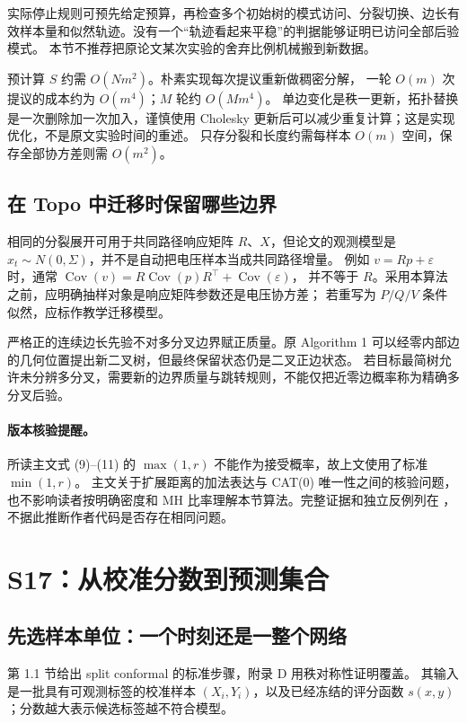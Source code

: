 实际停止规则可预先给定预算，再检查多个初始树的模式访问、分裂切换、边长有效样本量和似然轨迹。没有一个“轨迹看起来平稳”的判据能够证明已访问全部后验模式。
本节不推荐把原论文某次实验的舍弃比例机械搬到新数据。

预计算 $S$ 约需 $O(Nm^2)$。朴素实现每次提议重新做稠密分解，
一轮 $O(m)$ 次提议的成本约为 $O(m^4)$；$M$ 轮约 $O(Mm^4)$。
单边变化是秩一更新，拓扑替换是一次删除加一次加入，谨慎使用 Cholesky 更新后可以减少重复计算；这是实现优化，不是原文实验时间的重述。
只存分裂和长度约需每样本 $O(m)$ 空间，保存全部协方差则需 $O(m^2)$。

\subsection{在 Topo 中迁移时保留哪些边界}

相同的分裂展开可用于共同路径响应矩阵 $R$、$X$，但论文的观测模型是
$x_t\sim N(0,\Sigma)$，并不是自动把电压样本当成共同路径增量。
例如 $v=Rp+\varepsilon$ 时，通常
$\operatorname{Cov}(v)=R\operatorname{Cov}(p)R^\top+\operatorname{Cov}(\varepsilon)$，
并不等于 $R$。采用本算法之前，应明确抽样对象是响应矩阵参数还是电压协方差；
若重写为 $P/Q/V$ 条件似然，应标作教学迁移模型。

严格正的连续边长先验不对多分叉边界赋正质量。原 Algorithm 1 可以经零内部边的几何位置提出新二叉树，但最终保留状态仍是二叉正边状态。
若目标最简树允许未分辨多分叉，需要新的边界质量与跳转规则，不能仅把近零边概率称为精确多分叉后验。

\paragraph{版本核验提醒。}
所读主文式 (9)--(11) 的 $\max(1,r)$ 不能作为接受概率，故上文使用了标准 $\min(1,r)$。
主文关于扩展距离的加法表达与 CAT(0) 唯一性之间的核验问题，也不影响读者按明确密度和 MH 比率理解本节算法。完整证据和独立反例列在 ，不据此推断作者代码是否存在相同问题。

\section{S17：从校准分数到预测集合}
\label{sec:textbook-S17}

\subsection{先选样本单位：一个时刻还是一整个网络}

\citet{S17} 第 1.1 节给出 split conformal 的标准步骤，附录 D 用秩对称性证明覆盖。
其输入是一批具有可观测标签的校准样本 $(X_i,Y_i)$，以及已经冻结的评分函数
$s(x,y)$；分数越大表示候选标签越不符合模型。

